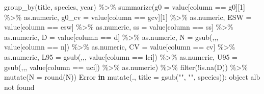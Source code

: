\documentclass[
]{book}
\newenvironment{Shaded}{\begin{snugshade}}{\end{snugshade}}
\newcommand{\AttributeTok}[1]{\textcolor[rgb]{0.77,0.63,0.00}{#1}}
\newcommand{\ControlFlowTok}[1]{\textcolor[rgb]{0.13,0.29,0.53}{\textbf{#1}}}
\newcommand{\DecValTok}[1]{\textcolor[rgb]{0.00,0.00,0.81}{#1}}
\newcommand{\FunctionTok}[1]{\textcolor[rgb]{0.00,0.00,0.00}{#1}}
\newcommand{\NormalTok}[1]{#1}
\newcommand{\SpecialCharTok}[1]{\textcolor[rgb]{0.00,0.00,0.00}{#1}}
\newcommand{\StringTok}[1]{\textcolor[rgb]{0.31,0.60,0.02}{#1}}
\begin{document}
\begin{Shaded}
\begin{Highlighting}[]
    \FunctionTok{group\_by}\NormalTok{(title, species, year) }\SpecialCharTok{\%\textgreater{}\%}
    \FunctionTok{summarize}\NormalTok{(}\AttributeTok{g0 =}\NormalTok{ value[column }\SpecialCharTok{==} \StringTok{\textquotesingle{}g0\textquotesingle{}}\NormalTok{][}\DecValTok{1}\NormalTok{] }\SpecialCharTok{\%\textgreater{}\%}\NormalTok{ as.numeric,}
              \AttributeTok{g0\_cv =}\NormalTok{ value[column }\SpecialCharTok{==} \StringTok{\textquotesingle{}gcv\textquotesingle{}}\NormalTok{][}\DecValTok{1}\NormalTok{] }\SpecialCharTok{\%\textgreater{}\%}\NormalTok{ as.numeric,}
              \AttributeTok{ESW =}\NormalTok{ value[column }\SpecialCharTok{==} \StringTok{\textquotesingle{}esw\textquotesingle{}}\NormalTok{] }\SpecialCharTok{\%\textgreater{}\%}\NormalTok{ as.numeric,}
              \AttributeTok{ss =}\NormalTok{ value[column }\SpecialCharTok{==} \StringTok{\textquotesingle{}ss\textquotesingle{}}\NormalTok{] }\SpecialCharTok{\%\textgreater{}\%}\NormalTok{ as.numeric,}
              \AttributeTok{D =}\NormalTok{ value[column }\SpecialCharTok{==} \StringTok{\textquotesingle{}d\textquotesingle{}}\NormalTok{] }\SpecialCharTok{\%\textgreater{}\%}\NormalTok{ as.numeric,}
              \AttributeTok{N =} \FunctionTok{gsub}\NormalTok{(}\StringTok{\textquotesingle{},\textquotesingle{}}\NormalTok{,}\StringTok{\textquotesingle{}\textquotesingle{}}\NormalTok{, value[column }\SpecialCharTok{==} \StringTok{\textquotesingle{}n\textquotesingle{}}\NormalTok{]) }\SpecialCharTok{\%\textgreater{}\%}\NormalTok{ as.numeric,}
              \AttributeTok{CV =}\NormalTok{ value[column }\SpecialCharTok{==} \StringTok{\textquotesingle{}cv\textquotesingle{}}\NormalTok{] }\SpecialCharTok{\%\textgreater{}\%}\NormalTok{ as.numeric,}
              \AttributeTok{L95 =} \FunctionTok{gsub}\NormalTok{(}\StringTok{\textquotesingle{},\textquotesingle{}}\NormalTok{,}\StringTok{\textquotesingle{}\textquotesingle{}}\NormalTok{, value[column }\SpecialCharTok{==} \StringTok{\textquotesingle{}lci\textquotesingle{}}\NormalTok{]) }\SpecialCharTok{\%\textgreater{}\%}\NormalTok{ as.numeric,}
              \AttributeTok{U95 =} \FunctionTok{gsub}\NormalTok{(}\StringTok{\textquotesingle{},\textquotesingle{}}\NormalTok{,}\StringTok{\textquotesingle{}\textquotesingle{}}\NormalTok{, value[column }\SpecialCharTok{==} \StringTok{\textquotesingle{}uci\textquotesingle{}}\NormalTok{]) }\SpecialCharTok{\%\textgreater{}\%}\NormalTok{ as.numeric) }\SpecialCharTok{\%\textgreater{}\%}
    \FunctionTok{filter}\NormalTok{(}\SpecialCharTok{!}\FunctionTok{is.na}\NormalTok{(D)) }\SpecialCharTok{\%\textgreater{}\%}
    \FunctionTok{mutate}\NormalTok{(}\AttributeTok{N =} \FunctionTok{round}\NormalTok{(N))}
\NormalTok{Error }\ControlFlowTok{in} \FunctionTok{mutate}\NormalTok{(., }\AttributeTok{title =} \FunctionTok{gsub}\NormalTok{(}\StringTok{"\textquotesingle{}"}\NormalTok{, }\StringTok{""}\NormalTok{, species))}\SpecialCharTok{:}\NormalTok{ object }\StringTok{\textquotesingle{}alb\textquotesingle{}}\NormalTok{ not found}


\end{Highlighting}
\end{Shaded}
\end{document}
